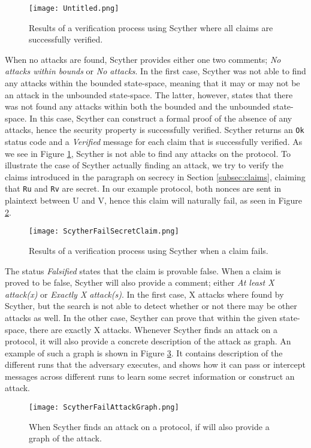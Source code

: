 \begin{figure}[h]
	\centering
	\texttt{[image: Untitled.png]}
	\caption{Results of a verification process using Scyther where all claims are successfully verified.}
	\label{fig:scyther-verify-claims}
\end{figure}

When no attacks are found, Scyther provides either one two comments; \emph{No attacks within bounds} or \emph{No attacks}. In the first case, Scyther was not able to find any attacks within the bounded state-space, meaning that it may or may not be an attack in the unbounded state-space. The latter, however, states that there was not found any attacks within both the bounded and the unbounded state-space. In this case, Scyther can construct a formal proof of the absence of any attacks, hence the security property is successfully verified. Scyther returns an \texttt{Ok} status code and a \emph{Verified} message for each claim that is successfully verified. As we see in Figure \ref{fig:scyther-verify-claims}, Scyther is not able to find any attacks on the protocol. To illustrate the case of Scyther actually finding an attack, we try to verify the claims introduced in the paragraph on secrecy in Section \ref{subsec:claims}, claiming that \texttt{Ru} and \texttt{Rv} are secret. In our example protocol, both nonces are sent in plaintext between U and V, hence this claim will naturally fail, as seen in Figure \ref{fig:scyther-verify-claims-fail}.


\begin{figure}[h]
	\centering
	\texttt{[image: ScytherFailSecretClaim.png]}
	\caption{Results of a verification process using Scyther when a claim fails.}
	\label{fig:scyther-verify-claims-fail}
\end{figure}

The status \emph{Falsified} states that the claim is provable false. When a claim is proved to be false, Scyther will also provide a comment; either \emph{At least X attack(x)} or \emph{Exactly X attack(s)}. In the first case, X attacks where found by Scyther, but the search is not able to detect whether or not there may be other attacks as well. In the other case, Scyther can prove that within the given state-space, there are exactly X attacks. Whenever Scyther finds an attack on a protocol, it will also provide a concrete description of the attack as graph. An example of such a graph is shown in Figure \ref{fig:scyther-graph}. It contains description of the different runs that the adversary executes, and shows how it can pass or intercept messages across different runs to learn some secret information or construct an attack.

\begin{figure}[h]
	\centering
	\texttt{[image: ScytherFailAttackGraph.png]}
	\caption{When Scyther finds an attack on a protocol, if will also provide a graph of the attack.}
	\label{fig:scyther-graph}
\end{figure}
